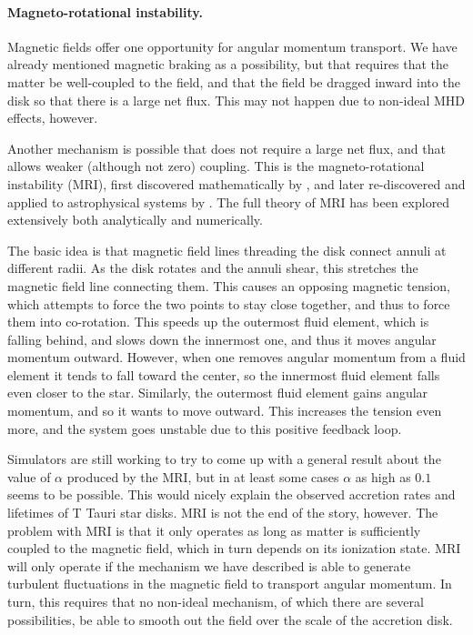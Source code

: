\paragraph{Magneto-rotational instability.}

Magnetic fields offer one opportunity for angular momentum transport. We have already mentioned magnetic braking as a possibility, but that requires that the matter be well-coupled to the field, and that the field be dragged inward into the disk so that there is a large net flux. This may not happen due to non-ideal MHD effects, however.

Another mechanism is possible that does not require a large net flux, and that allows weaker (although not zero) coupling. This is the magneto-rotational instability (MRI), first discovered mathematically by \citet{chandrasekhar61a}, and later re-discovered and applied to astrophysical systems by \citet{balbus91a}. The full theory of MRI has been explored extensively both analytically and numerically.

The basic idea is that magnetic field lines threading the disk connect annuli at different radii. As the disk rotates and the annuli shear, this stretches the magnetic field line connecting them. This causes an opposing magnetic tension, which attempts to force the two points to stay close together, and thus to force them into co-rotation. This speeds up the outermost fluid element, which is falling behind, and slows down the innermost one, and thus it moves angular momentum outward. However, when one removes angular momentum from a fluid element it tends to fall toward the center, so the innermost fluid element falls even closer to the star. Similarly, the outermost fluid element gains angular momentum, and so it wants to move outward. This increases the tension even more, and the system goes unstable due to this positive feedback loop.

Simulators are still working to try to come up with a general result about the value of $\alpha$ produced by the MRI, but in at least some cases $\alpha$ as high as $0.1$ seems to be possible. This would nicely explain the observed accretion rates and lifetimes of T Tauri star disks. MRI is not the end of the story, however. The problem with MRI is that it only operates as long as matter is sufficiently coupled to the magnetic field, which in turn depends on its ionization state. MRI will only operate if the mechanism we have described is able to generate turbulent fluctuations in the magnetic field to transport angular momentum. In turn, this requires that no non-ideal mechanism, of which there are several possibilities, be able to smooth out the field over the scale of the accretion disk.

